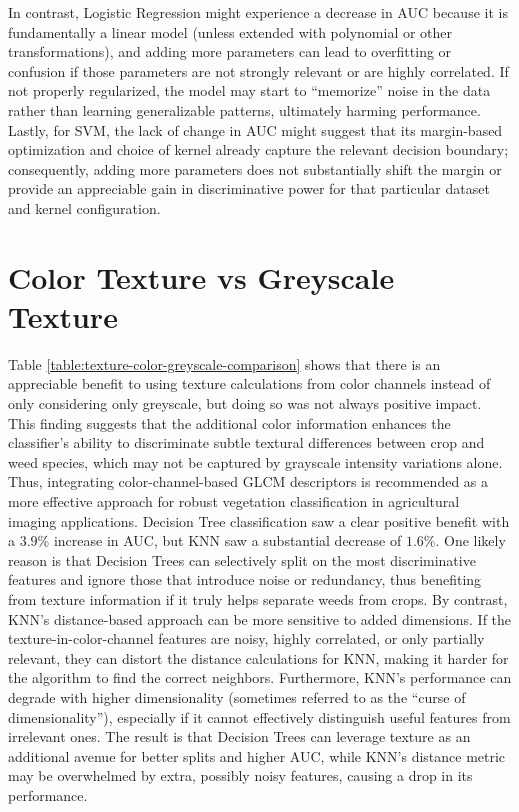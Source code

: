 \documentclass[letterpaper]{report}
\begin{document}
In contrast, Logistic Regression might experience a decrease in AUC because it is fundamentally a linear model (unless extended with polynomial or other transformations), and adding more parameters can lead to overfitting or confusion if those parameters are not strongly relevant or are highly correlated. If not properly regularized, the model may start to “memorize” noise in the data rather than learning generalizable patterns, ultimately harming performance. Lastly, for SVM, the lack of change in AUC might suggest that its margin-based optimization and choice of kernel already capture the relevant decision boundary; consequently, adding more parameters does not substantially shift the margin or provide an appreciable gain in discriminative power for that particular dataset and kernel configuration.


\section{Color Texture vs Greyscale Texture}
Table \ref{table:texture-color-greyscale-comparison} shows that there is an appreciable benefit to using texture calculations from color channels  instead of only considering only greyscale, but doing so was not always positive impact. This finding suggests that the additional color information enhances the classifier’s ability to discriminate subtle textural differences between crop and weed species, which may not be captured by grayscale intensity variations alone. Thus, integrating color-channel-based GLCM descriptors is recommended as a more effective approach for robust vegetation classification in agricultural imaging applications. Decision Tree classification saw a clear positive benefit with a $3.9\%$ increase in AUC, but KNN saw a substantial decrease of $1.6\%$. One likely reason is that Decision Trees can selectively split on the most discriminative features and ignore those that introduce noise or redundancy, thus benefiting from texture information if it truly helps separate weeds from crops. By contrast, KNN’s distance-based approach can be more sensitive to added dimensions. If the texture-in-color-channel features are noisy, highly correlated, or only partially relevant, they can distort the distance calculations for KNN, making it harder for the algorithm to find the correct neighbors. Furthermore, KNN’s performance can degrade with higher dimensionality (sometimes referred to as the “curse of dimensionality”), especially if it cannot effectively distinguish useful features from irrelevant ones. The result is that Decision Trees can leverage texture as an additional avenue for better splits and higher AUC, while KNN’s distance metric may be overwhelmed by extra, possibly noisy features, causing a drop in its performance.
\end{document}
